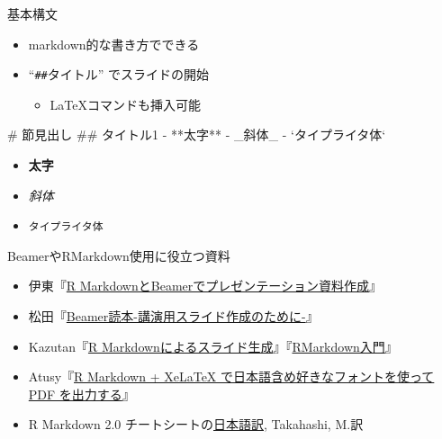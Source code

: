 \documentclass[14pt,ignorenonframetext,]{beamer}
\newenvironment{Shaded}{\begin{snugshade}}{\end{snugshade}}
\newcommand{\BaseNTok}[1]{\textcolor[rgb]{0.00,0.00,0.81}{#1}}
\newcommand{\FloatTok}[1]{\textcolor[rgb]{0.00,0.00,0.81}{#1}}
\newcommand{\FunctionTok}[1]{\textcolor[rgb]{0.00,0.00,0.00}{#1}}
\newcommand{\NormalTok}[1]{#1}
\providecommand{\tightlist}{%
  \setlength{\itemsep}{0pt}\setlength{\parskip}{0pt}}
\begin{document}
\begin{frame}[fragile]{基本構文}
\protect\hypertarget{ux57faux672cux69cbux6587}{}

\begin{itemize}
\tightlist
\item
  markdown的な書き方でできる
\item
  ``\texttt{\#\#}タイトル'' でスライドの開始

  \begin{itemize}
  \tightlist
  \item
    \LaTeX コマンドも挿入可能
  \end{itemize}
\end{itemize}

\begin{Shaded}
\begin{Highlighting}[]
\FunctionTok{# 節見出し}
\FunctionTok{## タイトル1}
\NormalTok{- **太字**}
\NormalTok{- }\FloatTok{_斜体_}
\FloatTok{- }\BaseNTok{`タイプライタ体`}
\end{Highlighting}
\end{Shaded}

\begin{itemize}
\tightlist
\item
  \textbf{太字}
\item
  \emph{斜体}
\item
  \texttt{タイプライタ体}
\end{itemize}

\end{frame}

\begin{frame}{BeamerやRMarkdown使用に役立つ資料}
\protect\hypertarget{beamerux3084rmarkdownux4f7fux7528ux306bux5f79ux7acbux3064ux8cc7ux6599}{}

\begin{itemize}
\tightlist
\item
  伊東『\href{https://www.slideshare.net/hirokito/r-markdownbeamer-88777082}{R
  MarkdownとBeamerでプレゼンテーション資料作成}』
\item
  松田『\href{http://ayapin-film.sakura.ne.jp/LaTeX/slides.html\#beamer}{Beamer読本-講演用スライド作成のために-}』
\item
  Kazutan『\href{https://kazutan.github.io/SappoRoR6/rmd_slide.html\#/}{R
  Markdownによるスライド生成}』『\href{https://kazutan.github.io/kazutanR/Rmd_intro.html}{RMarkdown入門}』
\item
  Atusy『\href{https://blog.atusy.net/2019/05/14/rmd2pdf-any-font/}{R
  Markdown + XeLaTeX で日本語含め好きなフォントを使って PDF
  を出力する}』
\item
  R Markdown 2.0
  チートシートの\href{https://rstudio.com/wp-content/uploads/2016/11/Rmarkdown-cheatsheet-2.0_ja.pdf}{日本語訳},
  Takahashi, M.訳
\end{itemize}

\end{frame}
\end{document}
